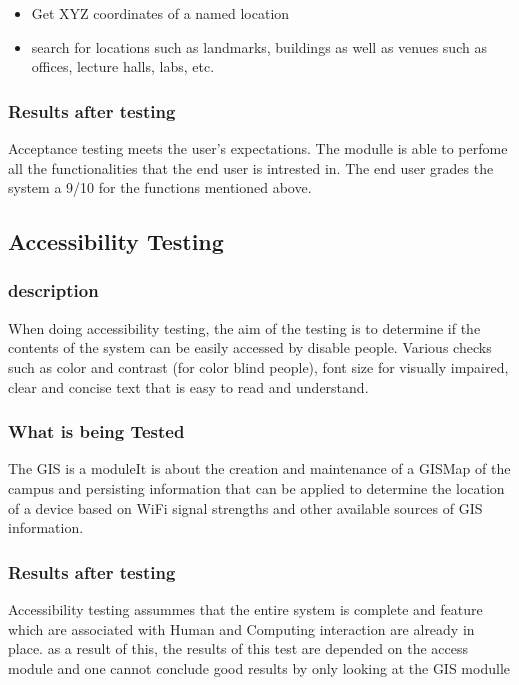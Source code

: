 \documentclass[12pt]{article}
\begin{document}
		\begin {itemize}
 			 \item Get XYZ coordinates of a named location
			  \item  search for locations such as landmarks, buildings as well as venues such as offices, 							lecture halls, labs, etc.
		\end {itemize}
		
		
		\subsubsection{Results after testing}
		Acceptance testing meets the user's expectations. The modulle is able to perfome all the functionalities that the end 			user is intrested in. 
		The end user grades the system a 9/10 for the functions mentioned above.
		
		
	\subsection{Accessibility Testing}
		\subsubsection{description}
		When doing accessibility testing, the aim of the testing is to determine if the contents of the system can be easily 			accessed by disable people. Various checks such as color and contrast (for color blind people), font size for visually 			impaired, clear and concise text that is easy to read and understand.
		
		\subsubsection{What is being Tested}
		The GIS is a moduleIt is about the creation and maintenance of a GISMap of the campus and persisting information that 			can be applied to determine the location of a device based on WiFi signal strengths and other available sources of GIS 			information.
		\subsubsection{Results after testing}
		Accessibility testing assummes that the entire system is complete and feature which are associated with Human and 			Computing interaction are already in place. as a result of this, the results of this test are depended on the access 			module and one cannot conclude good results by only looking at the GIS modulle 
	
\end{document}
